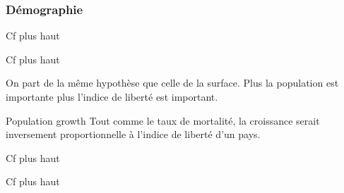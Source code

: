  
\subsubsection{Démographie} 
\begin{description}
\item [Fertility rate]
Cf plus haut
\item [Adolescent fertility]
Cf plus haut
\item [Population totale]
On part de la même hypothèse que celle de la surface. Plus la population est importante plus l'indice de liberté est important.
\item Population growth
Tout comme le taux de mortalité, la croissance serait inversement proportionnelle à l'indice de liberté d'un pays.
\item [Life expectancy]
Cf plus haut
\item [Surface]
Cf plus haut
\end{description}
 
